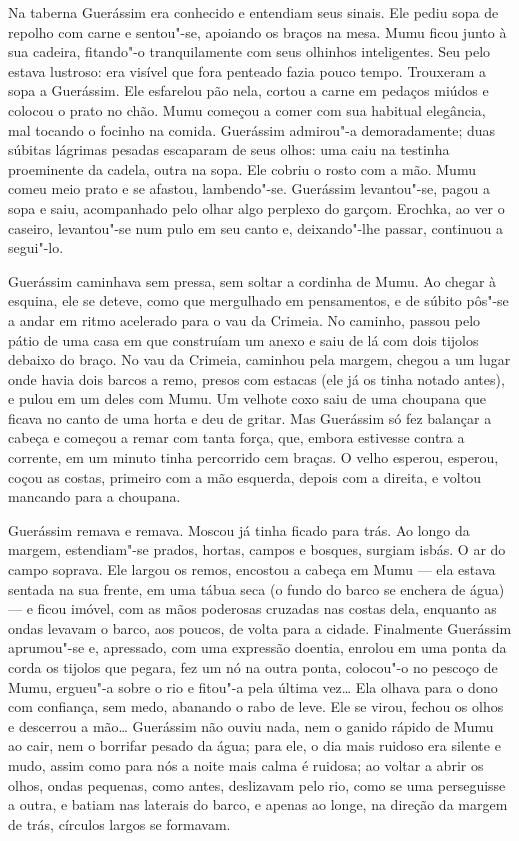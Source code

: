 Na taberna Guerássim era conhecido e entendiam seus sinais. Ele pediu
sopa de repolho com carne e sentou"-se, apoiando os braços na mesa. Mumu
ficou junto à sua cadeira, fitando"-o tranquilamente com seus olhinhos
inteligentes. Seu pelo estava lustroso: era visível que fora penteado
fazia pouco tempo. Trouxeram a sopa a Guerássim. Ele esfarelou pão nela,
cortou a carne em pedaços miúdos e colocou o prato no chão. Mumu começou
a comer com sua habitual elegância, mal tocando o focinho na comida.
Guerássim admirou"-a demoradamente; duas súbitas lágrimas pesadas
escaparam de seus olhos: uma caiu na testinha proeminente da cadela,
outra na sopa. Ele cobriu o rosto com a mão. Mumu comeu meio prato e se
afastou, lambendo"-se. Guerássim levantou"-se, pagou a sopa e saiu,
acompanhado pelo olhar algo perplexo do garçom. Erochka, ao ver o
caseiro, levantou"-se num pulo em seu canto e, deixando"-lhe passar,
continuou a segui"-lo.

Guerássim caminhava sem pressa, sem soltar a cordinha de Mumu. Ao chegar
à esquina, ele se deteve, como que mergulhado em pensamentos, e de
súbito pôs"-se a andar em ritmo acelerado para o vau da Crimeia. No
caminho, passou pelo pátio de uma casa em que construíam um anexo e saiu
de lá com dois tijolos debaixo do braço. No vau da Crimeia, caminhou
pela margem, chegou a um lugar onde havia dois barcos a remo, presos com
estacas (ele já os tinha notado antes), e pulou em um deles com Mumu. Um
velhote coxo saiu de uma choupana que ficava no canto de uma horta e deu
de gritar. Mas Guerássim só fez balançar a cabeça e começou a remar com
tanta força, que, embora estivesse contra a corrente, em um minuto tinha
percorrido cem braças. O velho esperou, esperou, coçou as costas,
primeiro com a mão esquerda, depois com a direita, e voltou mancando
para a choupana.

Guerássim remava e remava. Moscou já tinha ficado para trás. Ao longo da
margem, estendiam"-se prados, hortas, campos e bosques, surgiam isbás. O
ar do campo soprava. Ele largou os remos, encostou a cabeça em Mumu ---
ela estava sentada na sua frente, em uma tábua seca (o fundo do barco se
enchera de água) --- e ficou imóvel, com as mãos poderosas cruzadas nas
costas dela, enquanto as ondas levavam o barco, aos poucos, de volta
para a cidade. Finalmente Guerássim aprumou"-se e, apressado, com uma
expressão doentia, enrolou em uma ponta da corda os tijolos que pegara,
fez um nó na outra ponta, colocou"-o no pescoço de Mumu, ergueu"-a sobre o
rio e fitou"-a pela última vez\ldots{} Ela olhava para o dono com confiança,
sem medo, abanando o rabo de leve. Ele se virou, fechou os olhos e
descerrou a mão\ldots{} Guerássim não ouviu nada, nem o ganido rápido de Mumu
ao cair, nem o borrifar pesado da água; para ele, o dia mais ruidoso era
silente e mudo, assim como para nós a noite mais calma é ruidosa; ao
voltar a abrir os olhos, ondas pequenas, como antes, deslizavam pelo
rio, como se uma perseguisse a outra, e batiam nas laterais do barco, e
apenas ao longe, na direção da margem de trás, círculos largos se
formavam.

